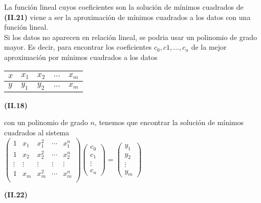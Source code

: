 \documentclass[twocolumn,twoside]{article}
\begin{document}
La funci\'on lineal cuyos coeficientes son la soluci\'on de m\'inimos cuadrados de \textbf{(II.21)}
viene a ser la aproximaci\'on de m\'inimos cuadrados a los datos con una funci\'on lineal. \\
Si los datos no aparecen en relaci\'on lineal, se podria usar un polinomio de grado
mayor. Es decir, para encontrar los coeficientes $c_{0}, c{1},\dots, c_{n}$ de la mejor aproximaci\'on
por m\'inimos cuadrados a los datos 
\begin{table}[!htb]
  \begin{center}
      
  
  \begin{tabular}{|l|l|l|l|l|}
  \hline
  
  $x$&   $x_{1}$&   $x_{2}$&   $\dots$&  $x_{m}$ \\ \hline
  $y$&   $y_{1}$&   $y_{2}$&   $\dots$&  $x_{m}$ \\ 
  \hline 
  \end{tabular}
  \hspace{1cm}\textbf{(II.18)}
  \end{center}
  \end{table} 

con un polinomio de grado $n$, tenemos que encontrar la soluci\'on de m\'inimos cuadrados
al sistema\vspace{0.1cm}\\
\small
$ 
\left(\begin{array}{ccccc}
  1 & x_1 &x_1^2 &\cdots &x_1^n\\ 
  1 & x_2 &x_2^2 &\cdots &x_2^n\\ 
  \vdots & \vdots &\vdots & \vdots &\vdots\\
  1 & x_m &x_m^2 &\cdots &x_m^n\\ 
 \end{array}\right) 
 \left(\begin{array}{c}
  c_0\\ 
  c_1\\
  \vdots\\
  c_n  
 \end{array}\right)=
 \left(\begin{array}{c}
  y_1\\ 
  y_2 \\
  \vdots \\
  y_m
 \end{array}\right)$
 \normalsize
 \begin{center}
   \textbf{(II.22)}
 \end{center}
 
\end{document}

